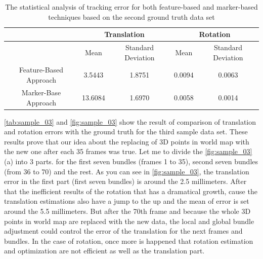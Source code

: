 \begin{table}[H]
\centering
  \begin{tabular}{| c || c | c | c | c |}
      \hline
       & \multicolumn{2}{c|}{Translation} & \multicolumn{2}{c|}{Rotation} \\ \hline
       & Mean & Standard Deviation & Mean & Standard Deviation \\ \hline
      Feature-Based Approach & 3.5443 & 1.8751 & 0.0094 & 0.0063 \\ \hline
      Marker-Base Approach & 13.6084 & 1.6970 & 0.0058 & 0.0014 \\ \hline
  \end{tabular}
  \caption{The statistical analysis of tracking error for both feature-based and marker-based techniques based on the second ground truth data set} \label{tab:sample_03}
\end{table}

\autoref{tab:sample_03} and \autoref{fig:sample_03} show the result of comparison of translation and rotation errors with the ground truth for the third sample data set. These results prove that our idea about the replacing of 3D points in world map with the new one after each 35 frames was true. Let me to divide the \autoref{fig:sample_03}(a) into 3 parts. for the first seven bundles (frames 1 to 35), second seven bundles (from 36 to 70) and the rest. As you can see in \autoref{fig:sample_03}, the translation error in the first part (first seven bundles) is around the 2.5 millimeters. After that the inefficient results of the rotation that has a dramatical growth, cause the translation estimations also have a jump to the up and the mean of error is set around the 5.5 millimeters. But after the 70th frame and because the whole 3D points in world map are replaced with the new data, the local and global bundle adjustment could control the error of the translation for the next frames and bundles. In the case of rotation, once more is happened that rotation estimation and optimization are not efficient as well as the translation part.

